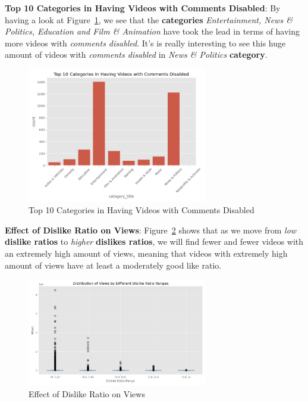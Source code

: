 \documentclass[a4paper,12pt]{article}
\begin{document}
\noindent \textbf{Top 10 Categories in Having Videos with Comments Disabled}: By having a look at Figure~\ref{fig:Figure_14}, we see that the \textbf{categories} \textit{Entertainment, News \& Politics, Education and Film \& Animation} 
have took the lead in terms of having more videos with \textit{comments disabled}. It's is really interesting to see this huge amount of videos with \textit{comments disabled} in \textit{News \& Politics} \textbf{category}.  

\begin{figure}[H]
    \centering
    \includegraphics[width=0.7\textwidth]{./images/distribution_of_dis_cmnt_diff_cat.png}
    \caption{Top 10 Categories in Having Videos with Comments Disabled}
    \label{fig:Figure_14}
\end{figure}


\noindent \textbf{Effect of Dislike Ratio on Views}: Figure~\ref{fig:Figure_15} shows that as we move from \textit{low} \textbf{dislike ratios} to \textit{higher} \textbf{dislikes ratios}, we will find fewer and fewer videos with an extremely high 
amount of views, meaning that videos with extremely high amount of views have at least a moderately good like ratio.

\begin{figure}[H]
    \centering
    \includegraphics[width=0.7\textwidth]{./images/distro_of_views_diff_dis_ratio_ranges.png}
    \caption{Effect of Dislike Ratio on Views}
    \label{fig:Figure_15}
\end{figure}
\end{document}
